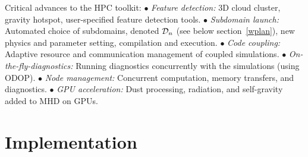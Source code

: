 \documentclass[a4paper,12pt]{article}
\newcommand{\answer}[1]{
	\begin{tcolorbox}[breakable, enhanced, colback=pink]
		#1
	\end{tcolorbox}
}
\begin{document}
\answer{Critical advances to the HPC toolkit:
\tabto{0em}
$\bullet$ {\textit{Feature detection:}} 3D cloud cluster, gravity hotspot,
user-specified feature detection tools.
\tabto{0em}
$\bullet$ {\textit{Subdomain launch:}} Automated choice of subdomains, denoted ${\cal D}_n$ (see below section~\ref{wplan}),
new physics and parameter setting, compilation and execution.
\tabto{0em}
$\bullet$ {\textit{Code coupling:}} Adaptive resource and communication
management of coupled simulations.
\tabto{0em}
$\bullet$ {\textit{On-the-fly-diagnostics:}} Running diagnostics concurrently
with the simulations (using ODOP).
\tabto{0em}
$\bullet$ {\textit{Node management:}} Concurrent computation, memory transfers,
and diagnostics.
\tabto{0em}
$\bullet$ {\textit{GPU acceleration:}} Dust processing, radiation, and
self-gravity added to MHD on GPUs.
   }


\section{Implementation}
\end{document}
